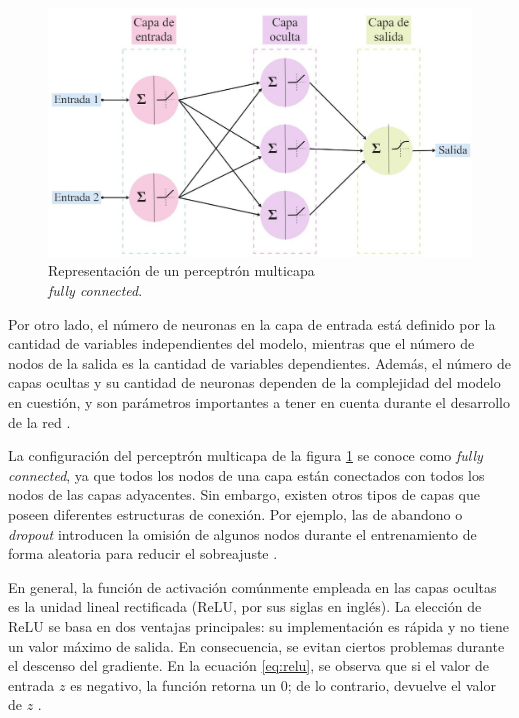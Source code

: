 \begin{figure}[h!]
	\centering
	\includegraphics[width=\textwidth]{./Figures/MLP.jpg}
	\caption{Representación de un perceptrón multicapa \\ \emph{fully connected}\protect\footnotemark.}
	\label{fig:MLP}
\end{figure}

\filbreak
Por otro lado, el número de neuronas en la capa de entrada está definido por la cantidad de variables independientes 
del modelo, mientras que el número de nodos de la salida es la cantidad de variables dependientes. Además, el número de 
capas ocultas y su cantidad de neuronas dependen de la complejidad del modelo en cuestión, y son parámetros importantes 
a tener en cuenta durante el desarrollo de la red \citep{CITE:42}.

La configuración del perceptrón multicapa de la figura \ref{fig:MLP} se conoce como \emph{fully connected}, ya que todos 
los nodos de una capa están conectados con todos los nodos de las capas adyacentes. Sin embargo, existen otros tipos de 
capas que poseen diferentes estructuras de conexión. Por ejemplo, las de abandono o \emph{dropout} introducen la omisión de 
algunos nodos durante el entrenamiento de forma aleatoria para reducir el sobreajuste \citep{CITE:44} \citep{CITE:45}.

En general, la función de activación comúnmente empleada en las capas ocultas es la unidad lineal rectificada (ReLU, 
por sus siglas en inglés). La elección de ReLU se basa en dos ventajas principales: su implementación es rápida y no 
tiene un valor máximo de salida. En consecuencia, se evitan ciertos problemas durante el descenso del gradiente. En la 
ecuación \ref{eq:relu}, se observa que si el valor de entrada $z$ es negativo, la función retorna un 0; de lo contrario, 
devuelve el valor de $z$ \citep{CITE:44}. 

